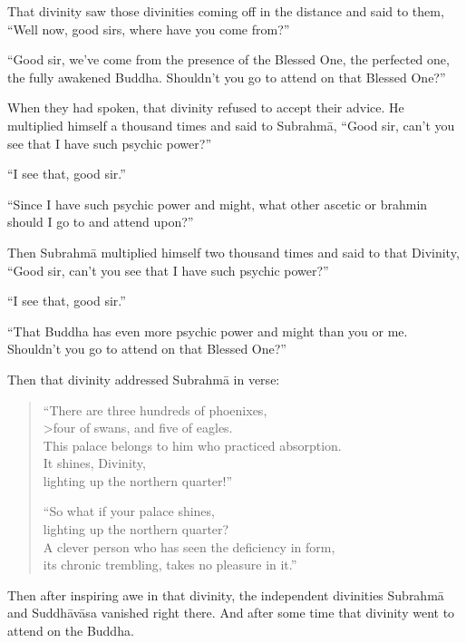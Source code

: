 \documentclass[12pt,openany]{book}%
\begin{document}
That divinity saw those divinities coming off in the distance and said to them, “Well now, good sirs, where have you come from?” 

“Good sir, we’ve come from the presence of the Blessed One, the perfected one, the fully awakened Buddha. Shouldn’t you go to attend on that Blessed One?” 

When they had spoken, that divinity refused to accept their advice. He multiplied himself a thousand times and said to \textsanskrit{Subrahmā}, “Good sir, can’t you see that I have such psychic power?” 

“I see that, good sir.” 

“Since I have such psychic power and might, what other ascetic or brahmin should I go to and attend upon?” 

Then \textsanskrit{Subrahmā} multiplied himself two thousand times and said to that Divinity, “Good sir, can’t you see that I have such psychic power?” 

“I see that, good sir.” 

“That Buddha has even more psychic power and might than you or me. Shouldn’t you go to attend on that Blessed One?” 

Then that divinity addressed \textsanskrit{Subrahmā} in verse: 

\begin{verse}%
“There are three hundreds of phoenixes, \\>four of swans, and five of eagles. \\
This palace belongs to him who practiced absorption. \\
It shines, Divinity, \\
lighting up the northern quarter!” 

“So what if your palace shines, \\
lighting up the northern quarter? \\
A clever person who has seen the deficiency in form, \\
its chronic trembling, takes no pleasure in it.” 

%
\end{verse}

Then after inspiring awe in that divinity, the independent divinities \textsanskrit{Subrahmā} and \textsanskrit{Suddhāvāsa} vanished right there. And after some time that divinity went to attend on the Buddha. 
\end{document}
